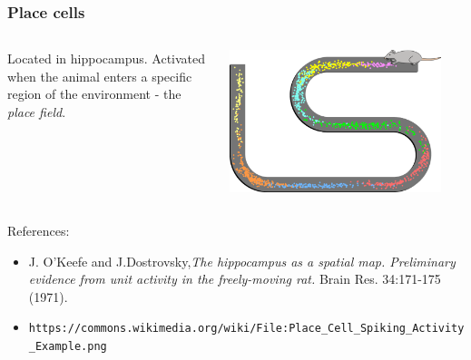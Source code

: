 \documentclass[mathserif]{beamer}
\begin{document}
%
%
%
\begin{frame}
\frametitle{Place cells}
  \begin{columns}[T]
    \begin{column}{.5\textwidth}
			Located in hippocampus. Activated when the animal enters a specific region of the environment - the \textit{place field}.
    \end{column}
    \begin{column}{.5\textwidth}
    \includegraphics[width=0.9\textwidth]{Place_Cell_Spiking_Activity_Example.png}
    \end{column}
  \end{columns}	

  {\small References: \newline
  	\begin{itemize}
  	\item J. O'Keefe and J.Dostrovsky,\textit{The hippocampus as a spatial map. Preliminary evidence from unit activity in the freely-moving rat.} Brain Res. 34:171-175 (1971). 
	\item\texttt{https://commons.wikimedia.org/wiki/File:\linebreak Place\_Cell\_Spiking\_Activity\_Example.png}
	\end{itemize}}
\end{frame}
\end{document}
